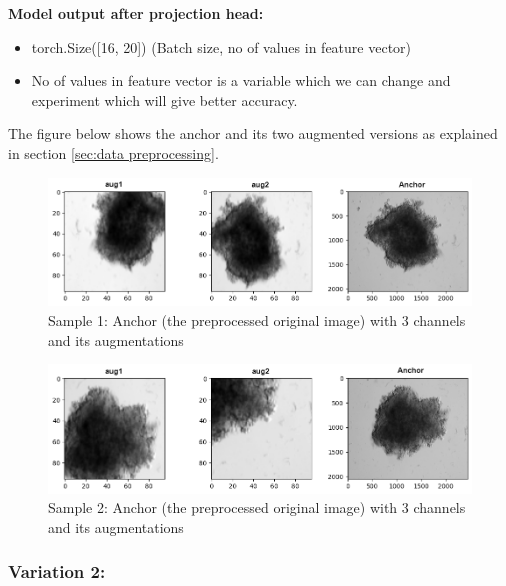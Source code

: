 \textbf{Model output after projection head:}
\begin{itemize}
  \item torch.Size([16, 20])  (Batch size, no of values in feature vector)  
  \item No of values in feature vector is a variable which we can change and experiment which will give better accuracy.
\end{itemize}

The figure below shows the anchor and its two augmented versions as explained in section \ref{sec:data preprocessing}.

\begin{figure}[H]
  \centering
  \includegraphics[width=0.9\linewidth]{figures/3_1.png} %
  \caption{Sample 1: Anchor (the preprocessed original image) with 3 channels and its augmentations}
  \label{fig:augmentation}
\end{figure}


  \begin{figure}[H]
    \centering
    \includegraphics[width=0.9\linewidth]{figures/3_2fine.png} %
    \caption{Sample 2: Anchor (the preprocessed original image) with 3 channels and its augmentations}
    \label{fig:augmentations}
  \end{figure}
\subsubsection{Variation 2:}

